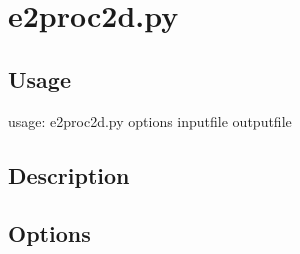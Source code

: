 \section{e2proc2d.py}  \label{e2proc2d.py}
\subsection{Usage}
usage: e2proc2d.py options inputfile outputfile


\subsection{Description}

\subsection{Options}


